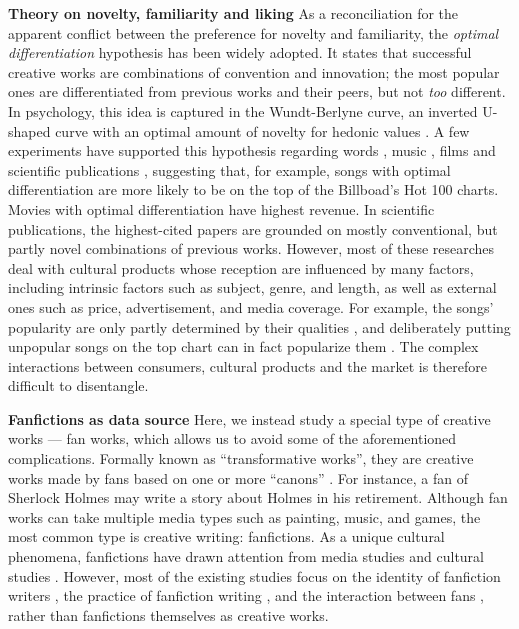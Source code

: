 \documentclass[letterpaper]{article} %
\begin{document}
\textbf{Theory on novelty, familiarity and liking}    As a reconciliation for the apparent conflict between the preference for novelty and familiarity, the \emph{optimal differentiation} hypothesis has been widely adopted. It states that successful creative works are combinations of convention and innovation; the most popular ones are differentiated from previous works and their peers, but not \emph{too} different. In psychology, this idea is captured in the Wundt-Berlyne curve, an inverted U-shaped curve with an optimal amount of novelty for hedonic values \cite{berlyne1970novelty}. A few experiments have supported this hypothesis regarding words \cite{sluckin1980liking}, music \cite{hargreaves1984effects}  \cite{askin2017makes},  films \cite{sreenivasan2013quantitative} and scientific publications \cite{uzzi2013atypical}, suggesting that, for example, songs with optimal differentiation are more likely to be on the top of the Billboad's Hot 100 charts. Movies with optimal differentiation have highest revenue. In scientific publications, the highest-cited papers are grounded on mostly conventional, but partly novel combinations of previous works. However, most of these researches deal with cultural products whose reception are influenced by many factors, including intrinsic factors such as subject, genre, and length, as well as external ones such as price, advertisement, and media coverage. For example, the songs' popularity are only partly determined by their qualities \cite{salganik2006experimental}, and deliberately putting unpopular songs on the top chart can in fact popularize them \cite{salganik2008leading}. The complex interactions between consumers, cultural products and the market is therefore difficult to disentangle. 
 
\textbf{Fanfictions as data source}   Here, we instead study a special type of creative works --- fan works, which allows us to avoid 
some of the aforementioned complications. Formally known as ``transformative works'', they are creative works made by fans based on one or more ``canons'' \cite{wiki:transf_work}. For instance, a fan of Sherlock Holmes may write a story about Holmes in his retirement. Although fan works can take multiple media types such as painting, music, and games, the most common type is creative writing: fanfictions. As a unique cultural phenomena, fanfictions have drawn attention from media studies and cultural studies \cite{thomas2011fanfiction}. However, most of the existing studies focus on the identity of fanfiction writers \cite{black2006language}, the practice of fanfiction writing \cite{LIT:LIT12061}, and the interaction between fans \cite{hills2015expertise}, rather than fanfictions themselves as creative works.
\end{document}
